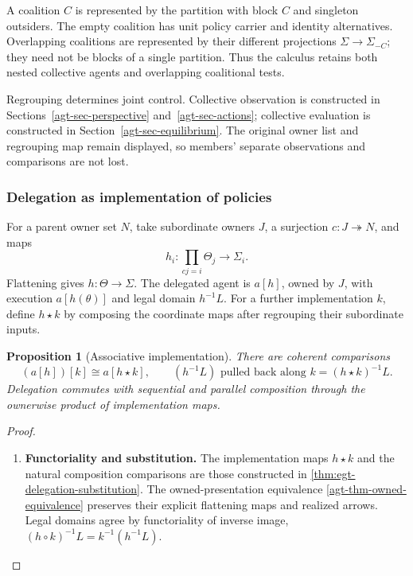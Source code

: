 \documentclass[11pt,a4paper]{article}
\numberwithin{equation}{section}
\newtheorem{proposition}[theorem]{Proposition}
\theoremstyle{definition}
\theoremstyle{remark}
\theoremstyle{plain}
\begin{document}
A coalition $C$ is represented by the partition with block $C$ and singleton
outsiders. The empty coalition has unit policy carrier and identity
alternatives. Overlapping coalitions are represented by their different
projections $\Sigma\to\Sigma_{-C}$; they need not be blocks of a single
partition. Thus the calculus retains both nested collective agents and
overlapping coalitional tests.

Regrouping determines joint control. Collective observation is constructed
in Sections~\ref{agt-sec-perspective} and~\ref{agt-sec-actions}; collective
evaluation is constructed in Section~\ref{agt-sec-equilibrium}. The original
owner list and regrouping map remain displayed, so members' separate
observations and comparisons are not lost.

\subsubsection{Delegation as implementation of policies}

For a parent owner set $N$, take subordinate owners $J$, a surjection
$c:J\twoheadrightarrow N$, and maps
\[
 h_i:\prod_{cj=i}\Theta_j\longrightarrow\Sigma_i.
\]
Flattening gives $h:\Theta\to\Sigma$. The delegated agent is $a[h]$,
owned by $J$, with execution $a[h(\theta)]$ and legal domain $h^{-1}L$.
For a further implementation $k$, define $h\star k$ by composing the
coordinate maps after regrouping their subordinate inputs.

\begin{proposition}[Associative implementation]
\label{agt-prop-delegation}
There are coherent comparisons
\[
 (a[h])[k]\cong a[h\star k],
 \qquad (h^{-1}L)\text{ pulled back along }k=(h\star k)^{-1}L.
\]
Delegation commutes with sequential and parallel composition through the
ownerwise product of implementation maps.
\end{proposition}
\begin{proof}
\leavevmode
\begin{enumerate}[label=\textup{(\arabic*)},leftmargin=*,itemsep=4pt,topsep=3pt]
  \item \textbf{Functoriality and substitution.} The implementation maps $h\star k$ and the natural composition
comparisons are those constructed in
\cref{thm:egt-delegation-substitution}. The owned-presentation equivalence
\cref{agt-thm-owned-equivalence} preserves their explicit flattening
maps and realized arrows. Legal domains agree by functoriality of
inverse image, $(h\circ k)^{-1}L=k^{-1}(h^{-1}L)$.
\end{enumerate}
\end{proof}
\end{document}
